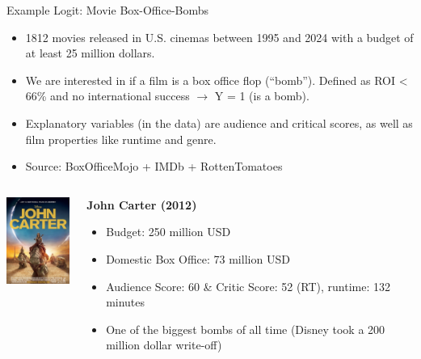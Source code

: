 \documentclass[
  10pt,
  ignorenonframetext,
]{beamer}
\providecommand{\tightlist}{%
  \setlength{\itemsep}{0pt}\setlength{\parskip}{0pt}}\usepackage{longtable,booktabs,array}
\begin{document}
\begin{frame}{Example Logit: Movie Box-Office-Bombs}
\label{example-logit-movie-box-office-bombs}
\small

\begin{itemize}
\item
  1812 movies released in U.S. cinemas between 1995 and 2024 with a
  budget of at least 25 million dollars.
\item
  We are interested in if a film is a box office flop (``bomb'').
  Defined as ROI \textless{} 66\% and no international success
  \(\rightarrow\) Y = 1 (is a bomb).
\item
  Explanatory variables (in the data) are audience and critical scores,
  as well as film properties like runtime and genre.
\item
  Source: BoxOfficeMojo + IMDb + RottenTomatoes
\end{itemize}

\begin{columns}[T]
\begin{column}{0.48\textwidth}
\centering

\includegraphics[width=1.04167in,height=\textheight]{images/MV5BZWNmZGYzZjUtODRmOS00ODgzLWE4NWQtMDI3MGUwNjRjYjY0XkEyXkFqcGc@._V1_FMjpg_UX1000_.jpg}
\end{column}

\begin{column}{0.48\textwidth}
\scriptsize

\textbf{John Carter (2012)}

\begin{itemize}
\tightlist
\item
  Budget: 250 million USD\\
\item
  Domestic Box Office: 73 million USD\\
\item
  Audience Score: 60 \& Critic Score: 52 (RT), runtime: 132 minutes\\
\item
  One of the biggest bombs of all time (Disney took a 200 million dollar
  write-off)
\end{itemize}
\end{column}
\end{columns}
\end{frame}
\end{document}
